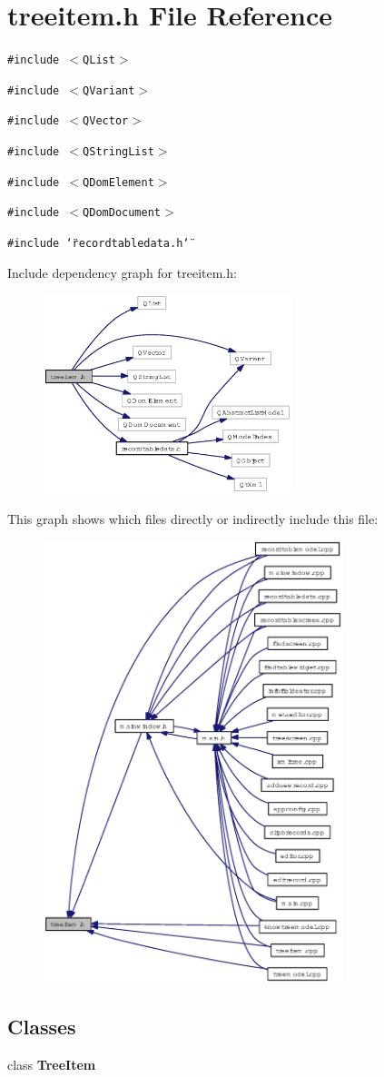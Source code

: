 \section{treeitem.h File Reference}
\label{treeitem_8h}
{\tt \#include $<$QList$>$}\par
{\tt \#include $<$QVariant$>$}\par
{\tt \#include $<$QVector$>$}\par
{\tt \#include $<$QString\-List$>$}\par
{\tt \#include $<$QDom\-Element$>$}\par
{\tt \#include $<$QDom\-Document$>$}\par
{\tt \#include \char`\"{}recordtabledata.h\char`\"{}}\par


Include dependency graph for treeitem.h:\begin{figure}[H]
\begin{center}
\leavevmode
\includegraphics[width=205pt]{treeitem_8h__incl}
\end{center}
\end{figure}


This graph shows which files directly or indirectly include this file:\begin{figure}[H]
\begin{center}
\leavevmode
\includegraphics[width=247pt]{treeitem_8h__dep__incl}
\end{center}
\end{figure}
\subsection*{Classes}
\begin{CompactItemize}
\item 
class {\bf Tree\-Item}
\end{CompactItemize}
